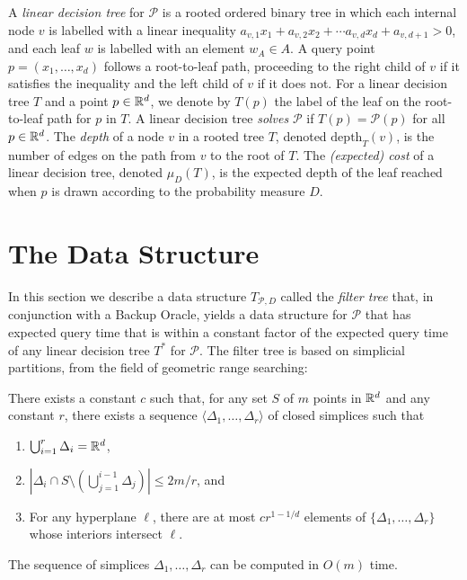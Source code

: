 \documentclass{patmorin}
\newcommand{\depth}{\mathrm{depth}}
\begin{document}
A \emph{linear decision tree} for $\mathcal{P}$ is a rooted ordered
binary tree in which each internal node $v$ is labelled with a linear
inequality $a_{v,1}x_1 + a_{v,2}x_2 + \cdots a_{v,d}x_d + a_{v,d+1} > 0$,
and each leaf $w$ is labelled with an element $w_A\in A$.  A query point
$p=(x_1,\ldots,x_d)$ follows a root-to-leaf path, proceeding to the right
child of $v$ if it satisfies the inequality and the left child of $v$
if it does not.  For a linear decision tree $T$ and a point $p\in\mathbb{R}^d$,
we denote by $T(p)$ the label of the leaf on the root-to-leaf path
for $p$ in $T$.  A linear decision tree \emph{solves} $\mathcal{P}$ if
$T(p)=\mathcal{P}(p)$ for all $p\in\mathbb{R}^d$. The \emph{depth} of a node $v$
in a rooted tree $T$, denoted $\depth_T(v)$, is the number of edges on
the path from $v$ to the root of $T$.  The \emph{(expected) cost} of a
linear decision tree, denoted $\mu_D(T)$, is the expected depth of the
leaf reached when $p$ is drawn according to the probability measure $D$.


\section{The Data Structure}

In this section we describe a data structure $T_{\mathcal{P},D}$ called
the \emph{filter tree} that, in conjunction with a Backup Oracle, yields
a data structure for $\mathcal{P}$ that has expected query time that
is within a constant factor of the expected query time of any linear
decision tree $T^*$ for $\mathcal{P}$.  The filter tree is based on
simplicial partitions, from the field of geometric range searching:

\begin{thm}[Matou\v{s}ek 1992]
There exists a constant $c$ such that, for any set $S$ of $m$
points in $\mathbb{R}^d$ and any constant $r$, there exists a sequence
$\langle \Delta_1,\ldots,\Delta_r\rangle$ of closed simplices such that
  \begin{enumerate}
    \item $\bigcup_{i=1}^r \Delta_i = \mathbb{R}^d$,
    \item $\left|\Delta_i \cap S\setminus
    \left(\bigcup_{j=1}^{i-1}\Delta_j\right)\right| \le 2m/r$, and
    \item For any hyperplane $\ell$, there are at most $cr^{1-1/d}$ elements of
  $\{\Delta_1,\ldots,\Delta_r\}$ whose interiors intersect $\ell$.
  \end{enumerate}
  The sequence of simplices $\Delta_1,\ldots,\Delta_r$ can be computed
  in $O(m)$ time.
\end{thm}
\end{document}
